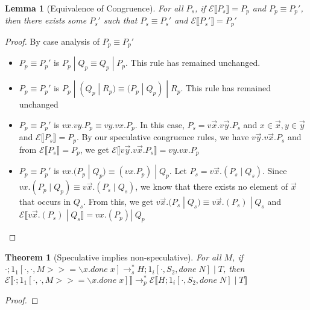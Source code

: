 \documentclass[9pt]{article}
\newtheorem{theorem}{Theorem}
\newtheorem{lemma}{Lemma}
\newcommand\specStep{\rightarrow_{s}}
\newcommand\parStep{\rightarrow_{p}}
\newcommand{\erase}[1]{\mathcal{E}\llbracket #1 \rrbracket}
\begin{document}
\begin{lemma}[Equivalence of Congruence]
\label{congruence}
For all $P_s$, if $\erase{P_s} = P_p$ and $P_p \equiv P_p'$, then there exists some $P_s'$ such that $P_s \equiv P_s'$ and $\erase{P_s'} = P_p'$
\end{lemma}

\begin{proof}
By case analysis of $P_p \equiv P_p'$
\begin{itemize}
\item $P_p \equiv P_p'$ is $P_p \; | \; Q_p \equiv Q_p \; | \; P_p$.  This rule has remained unchanged.  

\item $P_p \equiv P_p'$ is $P_p \; | \; (Q_p \; | \; R_p) \equiv (P_p \; | \; Q_p) \; | \; R_p$.  This rule has remained unchanged

\item $P_p \equiv P_p'$ is $vx.vy.P_p \equiv vy.vx.P_p$.  In this case, $P_s = v\vec{x}.v\vec{y}.P_s$ and $x \in \vec{x}, y \in \vec{y}$ and $\erase{P_s} = P_p$.  By our speculative congruence rules, we have $v\vec{y}.v\vec{x}.P_s$ and from $\erase{P_s} = P_p$, we get $\erase{v\vec{y}.v\vec{x}.P_s} = vy.vx.P_p$ 

\item $P_p \equiv P_p'$ is $vx.(P_p \; | \; Q_p) \equiv (vx.P_p) \; | \; Q_p$.  Let $P_s = v\vec{x}.(P_s \; | \; Q_s)$.  Since $vx.(P_p \; | \; Q_p) \equiv v\vec{x}.(P_s \; | \; Q_s)$, we know that there exists no element of $\vec{x}$ that occurs in $Q_s$.  From this, we get $v\vec{x}.(P_s \; | \; Q_s) \equiv v\vec{x}.(P_s) \; | \; Q_s$ and $\erase{v\vec{x}.(P_s) \; | \; Q_s} = vx.(P_p) | \; Q_p$
\end{itemize}
\end{proof}

\begin{theorem}[Speculative implies non-speculative]
For all $M$, if $\cdot; 1_1[\cdot, \cdot, M >>= \backslash x. done \; x] \specStep^* H; 1_i[\cdot, S_2, done \; N] \; | \; T$, then $\erase{\cdot; 1_1[\cdot, \cdot, M >>= \backslash x. done \; x]} \parStep^* \erase{H; 1_i[\cdot, S_2, done \; N] \; | \; T}$

\end{theorem}

\begin{proof}

\end{proof}
\end{document}
